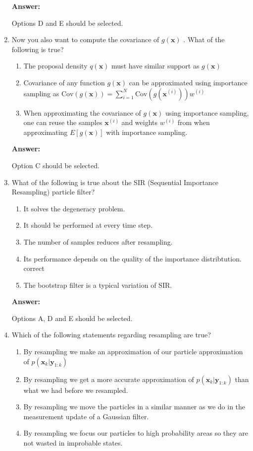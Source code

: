\begin{enumerate}
\textbf{Answer:}

Options D and E should be selected.

\item Now you also want to compute the covariance of $g(\mathbf{x})$ . What of the following is true?

\begin{enumerate}
\item The proposal density $q(\mathbf{x})$ must have similar support as $g(\mathbf{x})$
\item Covariance of any function $g(\mathbf{x})$ can be approximated using importance sampling as $\text{Cov}(g(\mathbf{x})) = \sum_{i=1}^{N}\text{Cov}(g(\mathbf{x}^{(i)}))w^{(i)}$
\item When approximating the covariance of $g(\mathbf{x})$  using importance sampling, one can reuse the samples $\mathbf{x}^{(i)}$ and weights $w^{(i)}$ 
from when approximating $E[g(\mathbf{x})]$ with importance sampling.
\end{enumerate}

\textbf{Answer:}

Option C should be selected.

\item  What of the following is true about the SIR (Sequential Importance Resampling) particle filter?

\begin{enumerate}
\item It solves the degeneracy problem.
\item It should be performed at every time step. 
\item The number of samples reduces after resampling. 
\item Its performance depends on the quality of the importance distribtution. correct 
\item The bootstrap filter is a typical variation of SIR. 
\end{enumerate}

\textbf{Answer:}

Options A, D and E should be selected.


\item Which of the following statements regarding resampling are true?

\begin{enumerate}
\item By resampling we make an approximation of our particle approximation of $p(\mathbf{x}_k | \mathbf{y}_{1:k})$
\item By resampling we get a more accurate approximation of $p(\mathbf{x}_k | \mathbf{y}_{1:k})$ than what we had before we resampled.  
\item By resampling we move the particles in a similar manner as we do in the measurement update of a Gaussian filter. 
\item By resampling we focus our particles to high probability areas so they are not wasted in improbable states.  
\end{enumerate}


\end{enumerate}

